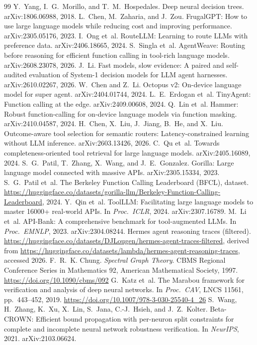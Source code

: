 \documentclass[10pt,twocolumn,letterpaper]{article}
\begin{document}
\begin{thebibliography}{99}
 Y.~Yang, I.~G.~Morillo, and T.~M.~Hospedales. Deep neural decision trees. arXiv:1806.06988, 2018.
 L.~Chen, M.~Zaharia, and J.~Zou. FrugalGPT: How to use large language models while reducing cost and improving performance. arXiv:2305.05176, 2023.
 I.~Ong et~al. RouteLLM: Learning to route LLMs with preference data. arXiv:2406.18665, 2024.
 S.~Singla et~al. AgentWeave: Routing before reasoning for efficient function calling in tool-rich language models. arXiv:2608.23078, 2026.
 J.~Li. Fast models, slow evidence: A paired and self-audited evaluation of System-1 decision models for LLM agent harnesses. arXiv:2610.02267, 2026.
 W.~Chen and Z.~Li. Octopus v2: On-device language model for super agent. arXiv:2404.01744, 2024.
 L.~E.~Erdogan et~al. TinyAgent: Function calling at the edge. arXiv:2409.00608, 2024.
 Q.~Lin et~al. Hammer: Robust function-calling for on-device language models via function masking. arXiv:2410.04587, 2024.
 H.~Chen, X.~Liu, J.~Jiang, B.~He, and X.~Liu. Outcome-aware tool selection for semantic routers: Latency-constrained learning without LLM inference. arXiv:2603.13426, 2026.
 C.~Qu et~al. Towards completeness-oriented tool retrieval for large language models. arXiv:2405.16089, 2024.
 S.~G.~Patil, T.~Zhang, X.~Wang, and J.~E.~Gonzalez. Gorilla: Large language model connected with massive APIs. arXiv:2305.15334, 2023.
 S.~G.~Patil et~al. The Berkeley Function Calling Leaderboard (BFCL), dataset. \url{https://huggingface.co/datasets/gorilla-llm/Berkeley-Function-Calling-Leaderboard}, 2024.
 Y.~Qin et~al. ToolLLM: Facilitating large language models to master 16000+ real-world APIs. In \emph{Proc.\ ICLR}, 2024. arXiv:2307.16789.
 M.~Li et~al. API-Bank: A comprehensive benchmark for tool-augmented LLMs. In \emph{Proc.\ EMNLP}, 2023. arXiv:2304.08244.
 Hermes agent reasoning traces (filtered). \url{https://huggingface.co/datasets/DJLougen/hermes-agent-traces-filtered}, derived from \url{https://huggingface.co/datasets/lambda/hermes-agent-reasoning-traces}, accessed 2026.
 F.~R.~K. Chung. \emph{Spectral Graph Theory}. CBMS Regional Conference Series in Mathematics 92, American Mathematical Society, 1997. \url{https://doi.org/10.1090/cbms/092}
 G.~Katz et~al. The Marabou framework for verification and analysis of deep neural networks. In \emph{Proc.\ CAV}, LNCS 11561, pp.~443--452, 2019. \url{https://doi.org/10.1007/978-3-030-25540-4_26}
 S.~Wang, H.~Zhang, K.~Xu, X.~Lin, S.~Jana, C.-J.~Hsieh, and J.~Z.~Kolter. Beta-CROWN: Efficient bound propagation with per-neuron split constraints for complete and incomplete neural network robustness verification. In \emph{NeurIPS}, 2021. arXiv:2103.06624.
\end{thebibliography}
\end{document}
